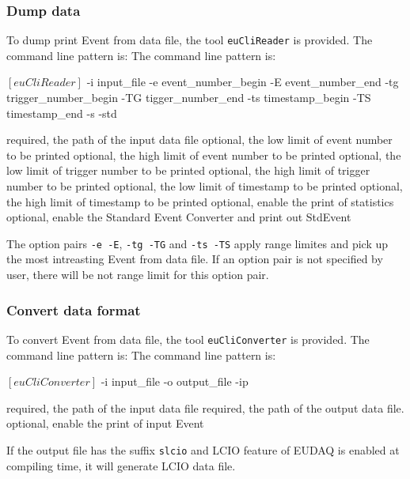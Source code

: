 \subsubsection{Dump data}
\label{sec:dumpafterdatatacking}
To dump print Event from data file, the tool \texttt{euCliReader} is provided. The command line pattern is:
The command line pattern is:
\begin{listing}[mybash]
$[euCliReader]$ -i {input_file} -e {event_number_begin} -E {event_number_end} -tg {trigger_number_begin} -TG {tigger_number_end} -ts {timestamp_begin} -TS {timestamp_end} -s -std
\end{listing}
\begin{description}
required, the path of the input data file
optional, the low limit of event number to be printed 
optional, the high limit of event number to be printed 
optional, the low limit of trigger number to be printed 
optional, the high limit of trigger number to be printed 
optional, the low limit of timestamp to be printed 
optional, the high limit of timestamp to be printed
optional, enable the print of statistics 
optional, enable the Standard Event Converter and print out StdEvent
\end{description}

The option pairs \texttt{-e -E}, \texttt{-tg -TG} and \texttt{-ts -TS} apply range limites and pick up the most intreasting Event from data file. If an option pair is not specified by user, there will be not range limit for this option pair.

\subsubsection{Convert data format}
\label{sec:convertafterdatatacking}
To convert Event from data file, the tool \texttt{euCliConverter} is provided. The command line pattern is:
The command line pattern is:
\begin{listing}[mybash]
$[euCliConverter]$ -i {input_file} -o {output_file} -ip
\end{listing}
\begin{description}
required, the path of the input data file
required, the path of the output data file. 
optional, enable the print of input Event 
\end{description}

If the output file has the suffix \texttt{slcio} and LCIO feature of EUDAQ is enabled at compiling time, it will generate LCIO data file.
